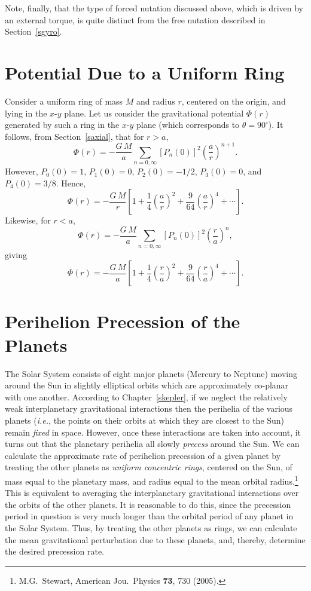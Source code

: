 Note, finally, that the type of forced nutation discussed above, which is driven by an external torque, is
quite distinct from the free nutation described  in Section~\ref{sgyro}.


\section{Potential Due to a Uniform Ring}
Consider a uniform ring of mass $M$ and radius $r$, centered on the origin, and lying in the $x$-$y$ plane.
Let us consider the gravitational potential $\Phi(r)$ generated by such a ring in the $x$-$y$ plane
(which corresponds to $\theta = 90^\circ$). It follows, from Section~\ref{saxial}, that for $r>a$,
\begin{equation}
\Phi(r) = - \frac{G\,M}{a}\sum_{n=0,\infty} [P_n(0)]^2\left(\frac{a}{r}\right)^{n+1}.
\end{equation}
However, $P_0(0)=1$, $P_1(0) = 0$, $P_2(0)=-1/2$, $P_3(0)=0$, and $P_4(0)=3/8$. Hence,
\begin{equation}\label{e13.117}
\Phi(r) = - \frac{G\,M}{r}\left[1 + \frac{1}{4}\left(\frac{a}{r}\right)^2 + \frac{9}{64}\left(\frac{a}{r}\right)^4+\cdots\right].
\end{equation}
Likewise, for $r<a$, 
\begin{equation}
\Phi(r) = - \frac{G\,M}{a}\sum_{n=0,\infty} [P_n(0)]^2\left(\frac{r}{a}\right)^{n}, 
\end{equation}
giving
\begin{equation}\label{e13.119}
\Phi(r) = - \frac{G\,M}{a}\left[1 + \frac{1}{4}\left(\frac{r}{a}\right)^2 + \frac{9}{64}\left(\frac{r}{a}\right)^4+\cdots\right].
\end{equation}

\section{Perihelion Precession of the Planets}\label{splanp}
The Solar System consists of eight major planets (Mercury to Neptune) moving around the Sun in slightly elliptical orbits which are approximately
co-planar with one another. According to Chapter~\ref{skepler}, if we neglect the relatively weak interplanetary
gravitational interactions then the perihelia of the various planets ({\em i.e.}, the points on their orbits at which they  are closest to the Sun)  remain {\em fixed}\/ in space. However, once these
interactions are taken into account, it turns out that the planetary perihelia all
slowly {\em precess}\/ around the Sun. We can  calculate the approximate rate of perihelion precession
of a given planet by treating the other planets as {\em uniform concentric rings}, centered on the Sun, of mass equal to the planetary mass, and
radius equal to the mean orbital radius.\footnote{M.G.~Stewart, American Jou.\ Physics {\bf 73}, 730 (2005).} This is equivalent to averaging the interplanetary gravitational interactions
over the orbits of the other planets. It is reasonable to do this, since the precession period in question is
very much longer than the orbital period of any planet in the Solar System. Thus, by treating the other planets as
rings, we can calculate the mean gravitational perturbation due to these planets, and, thereby, determine the
desired precession rate.

